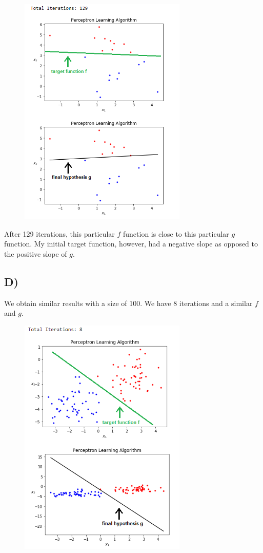 \documentclass[a4paper]{article}
\begin{document}
\begin{figure}[h]
  \begin{center}
    \includegraphics[width=80mm,scale=0.8]{problem14C.png}
  \end{center}
\end{figure}

After 129 iterations, this particular $f$ function is close to this particular $g$ function. My initial target function, however, had a negative slope as opposed to the positive slope of $g$.

\newpage

\subsection{D)}
We obtain similar results with a size of 100. We have 8 iterations and a similar $f$ and $g$.

\begin{figure}[h]
  \begin{center}
    \includegraphics[width=80mm,scale=0.8]{problem14D.png}
  \end{center}
\end{figure}
\end{document}

